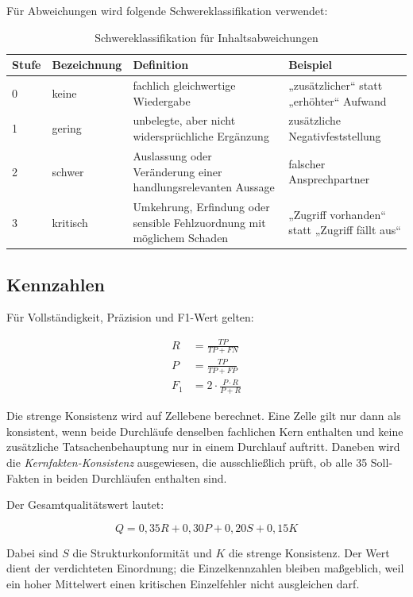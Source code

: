 \documentclass[
  10pt,
  ngerman,
  a4paper,
  toc=graduated,
  numbers=noenddot,
  headings=standardclasses
]{scrartcl}
\begin{document}
Für Abweichungen wird folgende Schwereklassifikation verwendet:

\begin{table}[H]
\centering
\small
\begin{tabularx}{\textwidth}{C{1.2cm}L{2.3cm}Y L{3.0cm}}
\toprule
{}
\textbf{Stufe} & \textbf{Bezeichnung} & \textbf{Definition} & \textbf{Beispiel}\\
 & keine & fachlich gleichwertige Wiedergabe & „zusätzlicher“ statt „erhöhter“ Aufwand\\
1 & gering & unbelegte, aber nicht widersprüchliche Ergänzung & zusätzliche Negativfeststellung\\
2 & schwer & Auslassung oder Veränderung einer handlungsrelevanten Aussage & falscher Ansprechpartner\\
3 & kritisch & Umkehrung, Erfindung oder sensible Fehlzuordnung mit möglichem Schaden & „Zugriff vorhanden“ statt „Zugriff fällt aus“\\
\bottomrule
\end{tabularx}
\caption{Schwereklassifikation für Inhaltsabweichungen}
\label{tab:fehlerschwere}
\end{table}

\subsection{Kennzahlen}

Für Vollständigkeit, Präzision und F1-Wert gelten:

\begin{align}
R &= \frac{TP}{TP+FN} \\
P &= \frac{TP}{TP+FP} \\
F_1 &= 2\cdot\frac{P\cdot R}{P+R}
\end{align}

Die strenge Konsistenz wird auf Zellebene berechnet. Eine Zelle gilt nur dann als konsistent, wenn beide Durchläufe denselben fachlichen Kern enthalten und keine zusätzliche Tatsachenbehauptung nur in einem Durchlauf auftritt. Daneben wird die \emph{Kernfakten-Konsistenz} ausgewiesen, die ausschließlich prüft, ob alle 35 Soll-Fakten in beiden Durchläufen enthalten sind.

Der Gesamtqualitätswert lautet:

\begin{equation}
Q = 0{,}35R + 0{,}30P + 0{,}20S + 0{,}15K
\end{equation}

Dabei sind $S$ die Strukturkonformität und $K$ die strenge Konsistenz. Der Wert dient der verdichteten Einordnung; die Einzelkennzahlen bleiben maßgeblich, weil ein hoher Mittelwert einen kritischen Einzelfehler nicht ausgleichen darf.
\end{document}
